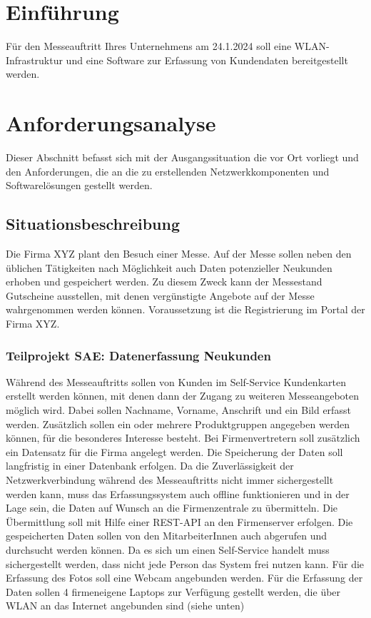 \chapter{Einführung}
Für den Messeauftritt Ihres Unternehmens am 24.1.2024 soll eine WLAN-Infrastruktur und eine Software zur Erfassung von Kundendaten bereitgestellt werden.

\chapter{Anforderungsanalyse}
Dieser Abschnitt befasst sich mit der Ausgangssituation die vor Ort vorliegt und den Anforderungen, die an die zu erstellenden Netzwerkkomponenten und Softwarelösungen gestellt werden.

\section{Situationsbeschreibung}
Die Firma XYZ plant den Besuch einer Messe. Auf der Messe sollen neben den üblichen Tätigkeiten nach Möglichkeit auch Daten potenzieller Neukunden erhoben und gespeichert werden. Zu diesem Zweck kann der Messestand Gutscheine ausstellen, mit denen vergünstigte Angebote auf der Messe wahrgenommen werden können. Voraussetzung ist die Registrierung im Portal der Firma XYZ.

\subsection{Teilprojekt SAE: Datenerfassung Neukunden}
Während des Messeauftritts sollen von Kunden im Self-Service Kundenkarten erstellt werden können, mit denen dann der Zugang zu weiteren Messeangeboten möglich wird. Dabei sollen Nachname, Vorname, Anschrift und ein Bild erfasst werden. Zusätzlich sollen ein oder mehrere Produktgruppen angegeben werden können, für die besonderes Interesse besteht. Bei Firmenvertretern soll zusätzlich ein Datensatz für die Firma angelegt werden.
Die Speicherung der Daten soll langfristig in einer Datenbank erfolgen. Da die Zuverlässigkeit der Netzwerkverbindung während des Messeauftritts nicht immer sichergestellt werden kann, muss das Erfassungssystem auch offline funktionieren und in der Lage sein, die Daten auf Wunsch an die Firmenzentrale zu übermitteln. Die Übermittlung soll mit Hilfe einer REST-API an den Firmenserver erfolgen. 
Die gespeicherten Daten sollen von den MitarbeiterInnen auch abgerufen und durchsucht werden können. Da es sich um einen Self-Service handelt muss sichergestellt werden, dass nicht jede Person das System frei nutzen kann. 
Für die Erfassung des Fotos soll eine Webcam angebunden werden. Für die Erfassung der Daten sollen 4 firmeneigene Laptops zur Verfügung gestellt werden, die über WLAN an das Internet angebunden sind (siehe unten)

